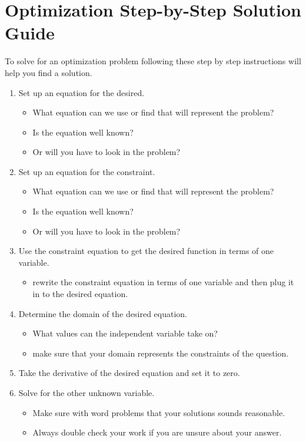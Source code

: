\documentclass[12pt]{article}
\begin{document}
  \section{Optimization Step-by-Step Solution Guide}
  To solve for an optimization problem following these step by step instructions will help you find a solution.
    \begin{enumerate}
      \item Set up an equation for the desired.
      \begin{itemize}
        \item What equation can we use or find that will represent the problem?
        \item Is the equation well known?
        \item Or will you have to look in the problem?
      \end{itemize}

      \item Set up an equation for the constraint.
      \begin{itemize}
        \item What equation can we use or find that will represent the problem?
        \item Is the equation well known?
        \item Or will you have to look in the problem?
      \end{itemize}

      \item Use the constraint equation to get the desired function in terms of one variable.
      \begin{itemize}
        \item rewrite the constraint equation in terms of one variable and then plug it in to the desired equation.
      \end{itemize}

      \item Determine the domain of the desired equation.
      \begin{itemize}
        \item What values can the independent variable take on?
        \item make sure that your domain represents the constraints of the question.
      \end{itemize}

      \item Take the derivative of the desired equation and set it to zero.
\newpage
      \item Solve for the other unknown variable.
      \begin{itemize}
        \item Make sure with word problems that your solutions sounds reasonable.
        \item Always double check your work if you are unsure about your answer.
      \end{itemize}
    \end{enumerate}
\noindent\makebox[\linewidth]{\rule{\paperwidth}{0.4pt}}
\end{document}
